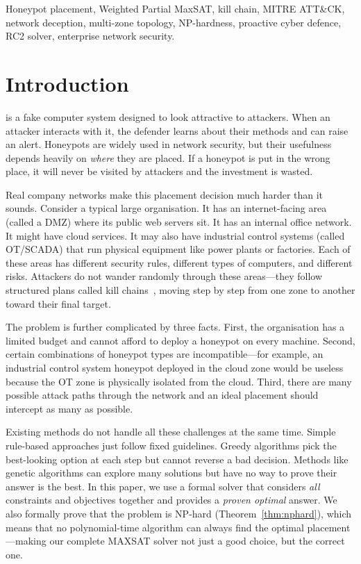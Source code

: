 \documentclass[journal]{IEEEtran}
\begin{document}
\begin{IEEEkeywords}
Honeypot placement, Weighted Partial MaxSAT, kill chain,
MITRE ATT\&CK, network deception, multi-zone topology,
NP-hardness, proactive cyber defence, RC2 solver, enterprise
network security.
\end{IEEEkeywords}

\section{Introduction}
\label{sec:intro}

 is a fake computer system
designed to look attractive to attackers.
When an attacker interacts with it, the defender learns about
their methods and can raise an alert.
Honeypots are widely used in network security, but their
usefulness depends heavily on \emph{where} they are placed.
If a honeypot is put in the wrong place, it will never be
visited by attackers and the investment is wasted.

Real company networks make this placement decision much
harder than it sounds.
Consider a typical large organisation.
It has an internet-facing area (called a DMZ) where its
public web servers sit.
It has an internal office network.
It might have cloud services.
It may also have industrial control systems (called OT/SCADA)
that run physical equipment like power plants or factories.
Each of these areas has different security rules, different
types of computers, and different risks.
Attackers do not wander randomly through these areas---they
follow structured plans called kill chains~\cite{hutchins2011},
moving step by step from one zone to another toward their
final target.

The problem is further complicated by three facts.
First, the organisation has a limited budget and cannot afford
to deploy a honeypot on every machine.
Second, certain combinations of honeypot types are
incompatible---for example, an industrial control system
honeypot deployed in the cloud zone would be useless because
the OT zone is physically isolated from the cloud.
Third, there are many possible attack paths through the
network and an ideal placement should intercept as many as
possible.

Existing methods do not handle all these challenges at the
same time.
Simple rule-based approaches just follow fixed guidelines.
Greedy algorithms pick the best-looking option at each step
but cannot reverse a bad decision.
Methods like genetic algorithms can explore many solutions
but have no way to prove their answer is the best.
In this paper, we use a formal solver that considers
\emph{all} constraints and objectives together and provides
a \emph{proven optimal} answer.
We also formally prove that the problem is NP-hard
(Theorem~\ref{thm:nphard}), which means that no polynomial-time
algorithm can always find the optimal placement---making our
complete MAXSAT solver not just a good choice, but the
correct one.
\end{document}
